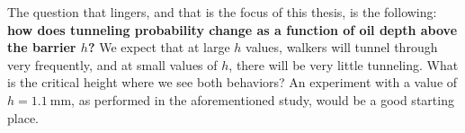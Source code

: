 The question that lingers, and that is the focus of this thesis, is the following: \textbf{how does tunneling probability change as a function of oil depth above the barrier $h$?} We expect that at large $h$ values, walkers will tunnel through very frequently, and at small values of $h$, there will be very little tunneling. What is the critical height where we see both behaviors? An experiment with a value of $h = 1.1~\mathrm{mm}$, as performed in the aforementioned study, would be a good starting place. 